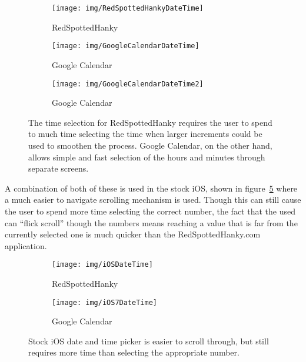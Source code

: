 \begin{figure}[ht]
    \centering
    \begin{subfigure}[b]{0.25\textwidth}
        \texttt{[image: img/RedSpottedHankyDateTime]}
        \caption{RedSpottedHanky}\label{fig:RedSpottedHankyDateTime}
    \end{subfigure}%
    \qquad
    \begin{subfigure}[b]{0.25\textwidth}
        \texttt{[image: img/GoogleCalendarDateTime]}
        \caption{Google Calendar}\label{fig:GoogleCalendarDateTime}
    \end{subfigure}
    \qquad
    \begin{subfigure}[b]{0.25\textwidth}
        \texttt{[image: img/GoogleCalendarDateTime2]}
        \caption{Google Calendar}\label{fig:GoogleCalendarDateTime2}
    \end{subfigure}
    \caption{The time selection for RedSpottedHanky requires the user to
    spend to much time selecting the time when larger increments could be
    used to smoothen the process. Google Calendar, on the other hand,
    allows simple and fast selection of the hours and minutes through
    separate screens.}\label{fig:date_time_selection}
\end{figure}

A combination of both of these is used in the stock iOS, shown in
figure~\ref{fig:iOSDateTime}\cite{iOSDateTime} where a much easier to navigate
scrolling mechanism is used. Though this can still cause the user to spend more
time selecting the correct number, the fact that the used can ``flick scroll''
though the numbers means reaching a value that is far from the currently
selected one is much quicker than the RedSpottedHanky.com application.

\begin{figure}[ht]
    \centering
    \begin{subfigure}[b]{0.25\textwidth}
        \texttt{[image: img/iOSDateTime]}
        \caption{RedSpottedHanky}
    \end{subfigure}%
    \qquad
    \begin{subfigure}[b]{0.35\textwidth}
        \texttt{[image: img/iOS7DateTime]}
        \caption{Google Calendar}
    \end{subfigure}
    \caption{Stock iOS date and time picker is easier to scroll through,
    but still requires more time than selecting the appropriate
    number.}\label{fig:iOSDateTime}
\end{figure}

